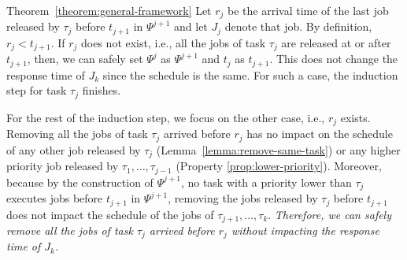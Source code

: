 \begin{appProof}{Theorem~\ref{theorem:general-framework}}
Let $r_j$ be the arrival time of the last job released by $\tau_j$ before $t_{j+1}$ in $\Psi^{j+1}$ and let $J_{j}$ denote that job. By definition, $r_j < t_{j+1}$. %
If $r_j$ does not exist, i.e., all the jobs of task $\tau_j$ are released at  or after $t_{j+1}$, then, we can safely set $\Psi^j$ as $\Psi^{j+1}$ and $t_j$ as $t_{j+1}$. This does not change the response time of $J_k$ since the schedule is the same. For such a case, the induction step for task $\tau_j$ finishes. 

For the rest of the induction step, we focus on the other case, i.e., $r_j$ exists.
Removing all the jobs of task $\tau_j$ arrived before $r_j$ has no impact on the schedule of any other job released by $\tau_j$ (Lemma~\ref{lemma:remove-same-task}) or any higher priority job released by $\tau_1, \ldots, \tau_{j-1}$ (Property \ref{prop:lower-priority}). Moreover, because by the construction of $\Psi^{j+1}$, no task with a priority lower than $\tau_j$ executes jobs before $t_{j+1}$ in $\Psi^{j+1}$, removing the jobs released by $\tau_j$ before $t_{j+1}$ does not impact the schedule of the jobs of $\tau_{j+1}, \ldots, \tau_{k}$. \emph{Therefore, we can safely remove all the jobs of task $\tau_j$ arrived before $r_j$ without impacting the response time of $J_{k}$.}


\end{appProof}
